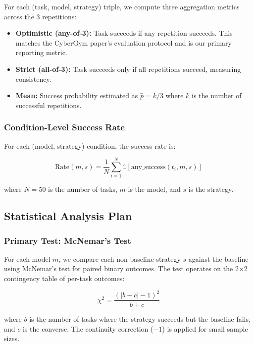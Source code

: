 \documentclass{ieeeaccess}
\begin{document}
For each (task, model, strategy) triple, we compute three aggregation metrics across the 3 repetitions:

\begin{itemize}
    \item \textbf{Optimistic (any-of-3):} Task succeeds if any repetition succeeds. This matches the CyberGym paper's evaluation protocol and is our primary reporting metric.
    \item \textbf{Strict (all-of-3):} Task succeeds only if all repetitions succeed, measuring consistency.
    \item \textbf{Mean:} Success probability estimated as $\hat{p} = k/3$ where $k$ is the number of successful repetitions.
\end{itemize}

\subsubsection{Condition-Level Success Rate}

For each (model, strategy) condition, the success rate is:

\begin{equation}
\text{Rate}(m, s) = \frac{1}{N} \sum_{i=1}^{N} \mathbb{1}[\text{any\_success}(t_i, m, s)]
\label{eq:rate}
\end{equation}

where $N = 50$ is the number of tasks, $m$ is the model, and $s$ is the strategy.

\subsection{Statistical Analysis Plan}
\label{sec:stats}

\subsubsection{Primary Test: McNemar's Test}

For each model $m$, we compare each non-baseline strategy $s$ against the baseline using McNemar's test for paired binary outcomes. The test operates on the 2$\times$2 contingency table of per-task outcomes:

\begin{equation}
\chi^2 = \frac{(|b - c| - 1)^2}{b + c}
\label{eq:mcnemar}
\end{equation}

where $b$ is the number of tasks where the strategy succeeds but the baseline fails, and $c$ is the converse. The continuity correction ($-1$) is applied for small sample sizes.
\end{document}
